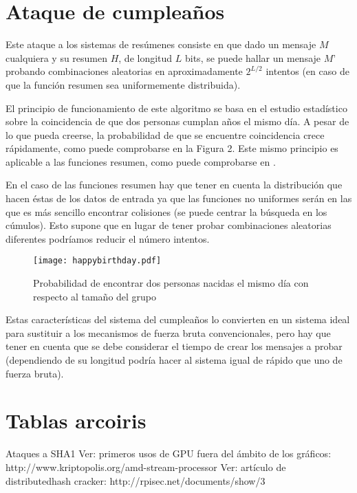 \section{Ataque de cumpleaños}

Este ataque a los sistemas de resúmenes consiste en que dado un mensaje $M$ cualquiera y su resumen $H$, de longitud $L$ bits, se puede hallar un mensaje $M’$ probando combinaciones aleatorias en aproximadamente $2^{L/2}$ intentos (en caso de que la función resumen sea uniformemente distribuida).

El principio de funcionamiento de este algoritmo se basa en el estudio estadístico sobre la coincidencia de que dos personas cumplan años el mismo día. A pesar de lo que pueda creerse, la probabilidad de que se encuentre coincidencia crece rápidamente, como puede comprobarse en la Figura 2. Este mismo principio es aplicable a las funciones resumen, como puede comprobarse en \cite{Bellare04hashfunction}.

En el caso de las funciones resumen hay que tener en cuenta la distribución que hacen éstas de los datos de entrada ya que las funciones no uniformes serán en las que es más sencillo encontrar colisiones (se puede centrar la búsqueda en los cúmulos). Esto supone que en lugar de tener probar   combinaciones aleatorias diferentes podríamos reducir el número intentos.
 
\begin{figure}
	\centering
	\texttt{[image: happybirthday.pdf]}
	\caption{Probabilidad de encontrar dos personas nacidas el mismo día con respecto al tamaño del grupo}\label{fig:Birthday}
\end{figure}


Estas características del sistema del cumpleaños lo convierten en un sistema ideal para sustituir a los mecanismos de fuerza bruta convencionales, pero hay que tener en cuenta que se debe considerar el tiempo de crear los mensajes a probar (dependiendo de su longitud podría hacer al sistema igual de rápido que uno de fuerza bruta).

\section{Tablas arcoiris}

Ataques a SHA1
Ver: primeros usos de GPU fuera del ámbito de los gráficos: http://www.kriptopolis.org/amd-stream-processor
Ver: artículo de distributedhash cracker: http://rpisec.net/documents/show/3

